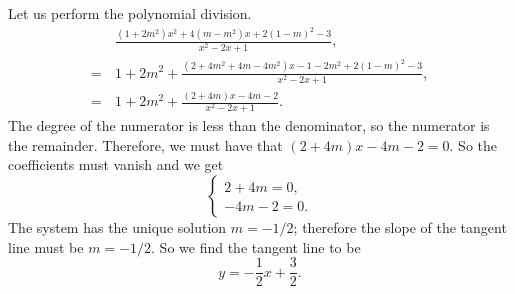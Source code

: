 Let us perform the polynomial division.
\begin{align}
& \frac{(1 + 2m^2)x^2 + 4(m - m^2)x + 2(1 - m)^2 - 3}{x^2 - 2x + 1}, \\
= \, & 1 + 2m^2 + \frac{(2 + 4m^2 + 4m - 4m^2)x - 1 - 2m^2 + 2(1 - m)^2 - 3}{x^2 - 2x + 1}, \\ 
= \, & 1 + 2m^2 + \frac{(2 + 4m)x - 4m - 2 }{x^2 - 2x + 1}.
\end{align}
The degree of the numerator is less than the denominator, so the numerator is the remainder. Therefore,
we must have that \((2 + 4m)x - 4m - 2 = 0\). So the coefficients must vanish and we get
\begin{equation}
\begin{cases}
2 + 4m = 0, \\
-4m - 2 = 0.
\end{cases}
\end{equation}
The system has the unique solution \(m = -1/2\); therefore the slope of the tangent line must be \(m = -1/2\).
So we find the tangent line to be
\begin{equation}
y = -\frac{1}{2}x + \frac{3}{2}.
\end{equation}
